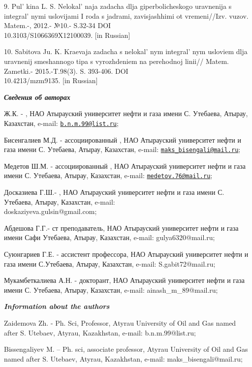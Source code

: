 \begin{references}
9. Pul' kina L. S. Nelokal' naja zadacha
dlja giperbolicheskogo uravnenija s integral' nymi
uslovijami I roda s jadrami, zavisjashhimi ot vremeni//Izv. vuzov.
Matem.-, 2012.- №10.- S.32-34 DOI \\10.3103/S1066369X12100039. {[}in
Russian{]}

10. Sabitova Ju. K. Kraevaja zadacha s nelokal' nym
integral' nym usloviem dlja uravnenij smeshannogo tipa s
vyrozhdeniem na perehodnoj linii// Matem. Zametki.- 2015.-T.98(3). S.
393-406. DOI \\10.4213/mzm9135. {[}in Russian{]}
\end{references}

\begin{authorinfo}
\emph{{\bfseries Сведения об авторах}}

Ж.К. - , НАО
Атырауский университет нефти и газа имени С. Утебаева, Атырау,
Казахстан, e-mail: \href{mailto:b.n.m.99@list.ru}{\nolinkurl{b.n.m.99@list.ru}};

Бисенгалиев М.Д. -  ассоциированный
, НАО Атырауский университет нефти и газа имени С.
Утебаева, Атырау, Казахстан, e-mail: \href{mailto:maks\_bisengali@mail.ru}{\nolinkurl{maks\_bisengali@mail.ru}};

Медетов Ш.М. -  ассоциированный
, НАО Атырауский университет нефти и газа имени С.
Утебаева, Атырау, Казахстан, e-mail: \href{mailto:medetov.76@mail.ru}{\nolinkurl{medetov.76@mail.ru}};

Досказиева Г.Ш.- , НАО
Атырауский университет нефти и газа имени С. Утебаева, Атырау,
Казахстан, e-mail: \\doskaziyeva.gulsin@gmail.com;

Абдешова Г.Г.- ст преподаватель, НАО Атырауский университет нефти и газа
имени Сафи Утебаева, Атырау, Казахстан, e-mail: gulya6320@mail.ru;

Суюнгариев Г.Е. -  ассистент профессора,
НАО Атырауский университет нефти и газа имени С.Утебаева, Атырау,
Казахстан, e-mail: S.gabit72@mail.ru;

Мукамбеткалиева А.Н. - докторант, НАО Атырауский университет нефти и
газа имени С. Утебаева, Атырау, Казахстан, e-mail: ainash\_m_89@mail.ru;

\emph{{\bfseries Information about the authors}}

Zaidemova Zh. - Ph. Sci, Professor, Atyrau Uni󠀁versity of Oil and Gas
nam󠀁ed aft󠀁er S. Ute󠀁baev, Aty󠀁rau, Kaz󠀁akhstan, e-mail:
b.n.m.99@list.ru;

Bissengaliyev M. -- Ph. sci, associate professor, Atyrau Uni󠀁versity of
Oil and Gas nam󠀁ed aft󠀁er S. Ute󠀁baev, Aty󠀁rau, Kaz󠀁akhstan, e-mail:
maks\_bisengali@mail.ru;


\end{authorinfo}
